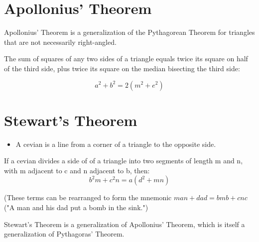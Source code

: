 \documentclass[12pt,a4paper]{article}
\begin{document}
\newpage

\section*{Apollonius' Theorem}
Apollonius' Theorem is a generalization of the Pythagorean Theorem for triangles that are not necessarily right-angled.

The sum of squares of any two sides of a triangle equals twice its square on half of the third side, plus twice its square on the median bisecting the third side:

\[ a^2+b^2=2(m^2+e^2) \]

\begin{center}
\end{center}

\section*{Stewart's Theorem}
\begin{itemize}
    \item A cevian is a line from a corner of a triangle to the opposite side.
\end{itemize}
If a cevian divides a side of of a triangle into two segments of length m and n, with m adjacent to c and n adjacent to b, then:
\[b^{2}m+c^{2}n=a(d^{2}+mn)\]

(These terms can be rearranged to form the mnemonic $man + dad = bmb +cnc$ ("A man and his dad put a bomb in the sink.")

\begin{center}
\end{center}

Stewart's Theorem is a generalization of Apollonius' Theorem, which is itself a generalization of Pythagoras' Theorem.
\end{document}
